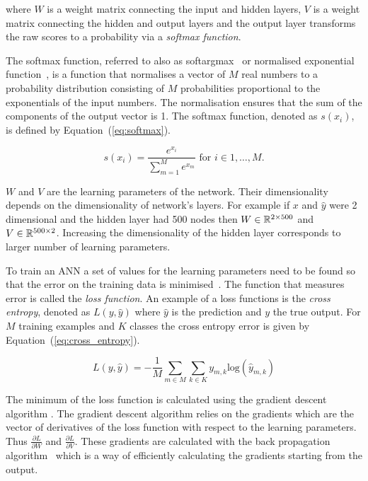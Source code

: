 where \(W\) is a weight matrix connecting the input and hidden layers, \(V\) is
a weight matrix connecting the hidden and output layers and the output layer
transforms the raw scores to a probability via a \textit{softmax function}.

The softmax function, referred to also as softargmax~\cite{Goodfellow2016} or
normalised exponential function~\cite{Bishop2006}, is a function that normalises
a vector of \(M\) real numbers to a probability distribution consisting of \(M\)
probabilities proportional to the exponentials of the input numbers. The
normalisation ensures that the sum of the components of the output vector is 1.
The softmax function, denoted as \(s(x_i)\),
is defined by Equation~(\ref{eq:softmax}).

\begin{equation}\label{eq:softmax}
    s(x_i) = \frac{e^{x_i}}{\sum\limits_{m=1}^{M} e^{x_m}} \text{ for } i \in 1, \dots, M.
\end{equation}

\(W\) and \(V\) are the learning parameters of the network. Their dimensionality
depends on the dimensionality of network's layers. For example if \(x\) and \(\hat{y}\)
were 2 dimensional and the hidden layer had 500 nodes then \(W \in \mathbb{R}^{2 \times 500}\)
and \(V \in \mathbb{R}^{500 \times 2}\). Increasing the dimensionality of the hidden
layer corresponds to larger number of learning parameters.

To train an ANN a set of values for the learning parameters need to be found so
that the error on the training data is minimised~\cite{Gurney2007}. The function that measures
error is called the \textit{loss function}.
An example of a loss functions is the
\textit{cross entropy}, denoted as \(L(y, \hat{y})\) where \(\hat{y}\) is the
prediction and \(y\) the true output. For \(M\) training examples and \(K\)
classes the cross entropy error is given by Equation~(\ref{eq:cross_entropy}).

\begin{equation}\label{eq:cross_entropy}
    L(y, \hat{y}) = - \frac{1}{M} \sum_{m\in M} \sum_{k \in K} y_{m, k} \text{log}(\hat{y}_{m, k})
\end{equation}

The minimum of the loss function is calculated using the gradient descent algorithm
\cite{Ruder2016}. The gradient descent algorithm relies on the gradients which
are the vector of derivatives of the loss function with respect to the learning
parameters. Thus \(\frac{\partial{L}}{\partial{W}}\) and
\(\frac{\partial{L}}{\partial{V}}\). These gradients are calculated with the
back propagation algorithm~\cite{Wythoff1993} which is a way of efficiently
calculating the gradients starting from the output.

